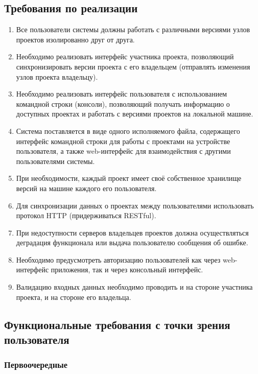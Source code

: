 \documentclass{bmstu}
\begin{document}
  \subsection{Требования по реализации}

  \begin{enumerate}[label*=\arabic*.]
  \item Все пользователи системы должны работать с различными версиями узлов проектов изолированно друг от друга.
  \item Необходимо реализовать интерфейс участника проекта, позволяющий синхронизировать версии проекта с его владельцем (отправлять изменения
  узлов проекта владельцу).
  \item Необходимо реализовать интерфейс пользователя с использованием командной строки (консоли), позволяющий получать информацию о доступных проектах и работать с версиями проектов на локальной машине.
  \item Система поставляется в виде одного исполняемого файла, содержащего интерфейс командной строки для работы с проектами на устройстве пользователя, а также web-интерфейс для взаимодействия с другими пользователями системы.
  \item При необходимости, каждый проект имеет своё собственное хранилище версий на машине каждого его пользователя.
  \item Для синхронизации данных о проектах между пользователями использовать протокол HTTP (придерживаться RESTful).
  \item При недоступности серверов владельцев проектов должна осуществляться деградация функционала или выдача пользователю сообщения об ошибке.
  \item Необходимо предусмотреть авторизацию пользователей как через web-интерфейс приложения, так и через консольный интерфейс.
  \item Валидацию входных данных необходимо проводить и на стороне участника проекта, и на стороне его владельца.
  \end{enumerate}

  \subsection{Функциональные требования с точки зрения пользователя}

  \subsubsection{Первоочередные}
\end{document}
